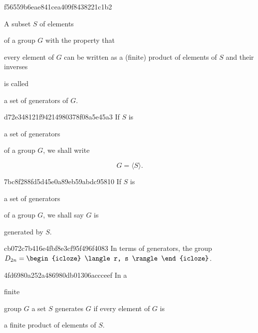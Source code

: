 \begin{note}{f56559b6eae841cea409f8438221c1b2}
    \begin{icloze}{3}A subset \({ S }\) of elements\end{icloze} of a group \({ G }\) with the property that \begin{icloze}{1}every element of \({ G }\) can be written as a (finite) product of elements of \({ S }\) and their inverses\end{icloze} is called \begin{icloze}{2}a set of generators of \({ G }\).\end{icloze}
\end{note}

\begin{note}{d72e348121f94214980378f08a5e45a3}
    If \({ S }\) is \begin{icloze}{2}a set of generators\end{icloze} of a group \({ G }\), we shall write
    \begin{icloze}{1}
        \[
            G = \langle S \rangle.
        \]
    \end{icloze}
\end{note}

\begin{note}{7bc8f288fd5d45e0a89eb59abdc95810}
    If \({ S }\) is \begin{icloze}{2}a set of generators\end{icloze} of a group \({ G }\), we shall say \({ G }\) is \begin{icloze}{1}generated by \({ S }\).\end{icloze}
\end{note}

\begin{note}{cb072c7b416e4fbf8e3cf95f496f4083}
    In terms of generators, the group \({ D_{2n} = \begin{icloze}{1}\langle r, s \rangle\end{icloze} }\).
\end{note}

\begin{note}{4fd6980a252a486980db01306accceef}
    In a \begin{icloze}{2}finite\end{icloze} group \({ G }\) a set \({ S }\) generates \({ G }\) if every element of \({ G }\) is \begin{icloze}{1}a finite product of elements of \({ S }\).\end{icloze}
\end{note}

